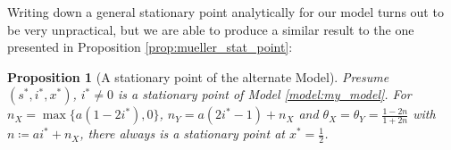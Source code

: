 \documentclass[12pt,a4paper,twoside]{article}
\newtheorem{prop}{Proposition}[section]
\begin{document}
Writing down a general stationary point analytically for our model turns out to be very unpractical, but we are able to produce a similar result to the one presented in Proposition \ref{prop:mueller_stat_point}:
\begin{prop}[A stationary point of the alternate Model]\label{prop:theor_stat_point_my_model}\phantom{lel}\newline
	Presume $\left(s^*, i^*, x^*\right)$, $i^* \neq 0$ is a stationary point of Model \ref{model:my_model}. \newline
	For $n_X = \max \lbrace a\left(1-2i^*\right), 0\rbrace$, $n_Y = a\left(2i^* - 1\right) + n_X$ and $\theta_X = \theta_Y = \frac{1-2n}{1+2n}$ with\newline $n \coloneqq ai^* + n_X$, there always is a stationary point at $x^* = \frac{1}{2}$.
\end{prop} 
\end{document}
